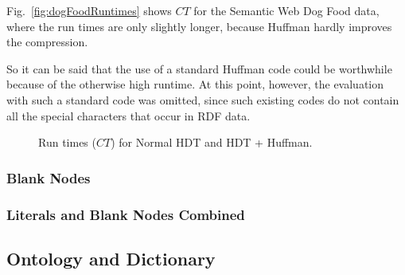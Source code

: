 Fig.~\ref{fig:dogFoodRuntimes} shows $CT$ for the Semantic Web Dog Food data, where the run times are only slightly longer, because Huffman hardly improves the compression.

So it can be said that the use of a standard Huffman code could be worthwhile because of the otherwise high runtime. At this point, however, the evaluation with such a standard code was omitted, since such existing codes do not contain all the special characters that occur in RDF data.


\begin{figure}[h]
	\centering
	\hfill
	\caption{Run times ($CT$) for Normal HDT and HDT + Huffman.}
	\label{fig:huffmanRuntimes}
\end{figure}

\subsubsection{Blank Nodes}

\subsubsection{Literals and Blank Nodes Combined}

\subsection{Ontology and Dictionary}






























